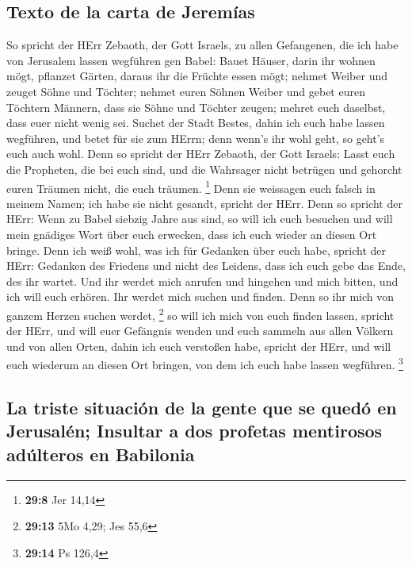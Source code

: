 \hypertarget{texto-de-la-carta-de-jeremuxedas}{%
\subsection{Texto de la carta de
Jeremías}\label{texto-de-la-carta-de-jeremuxedas}}

 So spricht der HErr Zebaoth, der Gott Israels, zu allen
Gefangenen, die ich habe von Jerusalem lassen wegführen gen Babel:
 Bauet Häuser, darin ihr wohnen mögt, pflanzet Gärten,
daraus ihr die Früchte essen mögt;  nehmet Weiber und
zeuget Söhne und Töchter; nehmet euren Söhnen Weiber und gebet euren
Töchtern Männern, dass sie Söhne und Töchter zeugen; mehret euch
daselbst, dass euer nicht wenig sei.  Suchet der Stadt
Bestes, dahin ich euch habe lassen wegführen, und betet für sie zum
HErrn; denn wenn's ihr wohl geht, so geht's euch auch wohl.
 Denn so spricht der HErr Zebaoth, der Gott Israels: Lasst
euch die Propheten, die bei euch sind, und die Wahrsager nicht betrügen
und gehorcht euren Träumen nicht, die euch träumen. \footnote{\textbf{29:8}
  Jer 14,14}  Denn sie weissagen euch falsch in meinem
Namen; ich habe sie nicht gesandt, spricht der HErr. 
Denn so spricht der HErr: Wenn zu Babel siebzig Jahre aus sind, so will
ich euch besuchen und will mein gnädiges Wort über euch erwecken, dass
ich euch wieder an diesen Ort bringe.  Denn ich weiß
wohl, was ich für Gedanken über euch habe, spricht der HErr: Gedanken
des Friedens und nicht des Leidens, dass ich euch gebe das Ende, des ihr
wartet.  Und ihr werdet mich anrufen und hingehen und
mich bitten, und ich will euch erhören.  Ihr werdet mich
suchen und finden. Denn so ihr mich von ganzem Herzen suchen werdet,
\footnote{\textbf{29:13} 5Mo 4,29; Jes 55,6}  so will ich
mich von euch finden lassen, spricht der HErr, und will euer Gefängnis
wenden und euch sammeln aus allen Völkern und von allen Orten, dahin ich
euch verstoßen habe, spricht der HErr, und will euch wiederum an diesen
Ort bringen, von dem ich euch habe lassen wegführen. \footnote{\textbf{29:14}
  Ps 126,4}

\hypertarget{la-triste-situaciuxf3n-de-la-gente-que-se-queduxf3-en-jerusaluxe9n-insultar-a-dos-profetas-mentirosos-aduxfalteros-en-babilonia}{%
\subsection{La triste situación de la gente que se quedó en Jerusalén;
Insultar a dos profetas mentirosos adúlteros en
Babilonia}\label{la-triste-situaciuxf3n-de-la-gente-que-se-queduxf3-en-jerusaluxe9n-insultar-a-dos-profetas-mentirosos-aduxfalteros-en-babilonia}}


